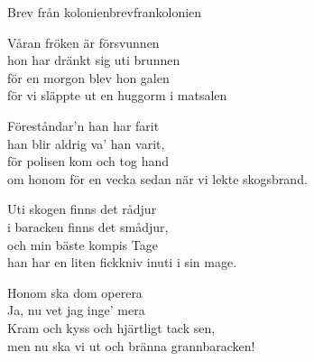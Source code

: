 \begin{song}{Brev från kolonien}{brevfrankolonien}
\begin{vers}
Våran fröken är försvunnen \\
hon har dränkt sig uti brunnen\\
för en morgon blev hon galen\\
för vi släppte ut en huggorm i matsalen\\
\end{vers}
\begin{vers}
Föreståndar'n han har farit \\
han blir aldrig va' han varit,\\
för polisen kom och tog hand\\
om honom för en vecka sedan när vi lekte skogsbrand.\\
\end{vers}
\begin{vers}
Uti skogen finns det rådjur \\
i baracken finns det smådjur,\\
och min bäste kompis Tage\\
han har en liten fickkniv inuti i sin mage.\\
\end{vers}
\begin{vers}
Honom ska dom operera \\
Ja, nu vet jag inge' mera\\
Kram och kyss och hjärtligt tack sen,\\
men nu ska vi ut och bränna grannbaracken!\\
\end{vers}
\end{song}

\newpage

